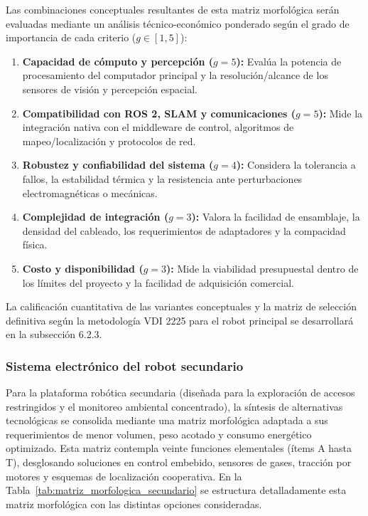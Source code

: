Las combinaciones conceptuales resultantes de esta matriz morfológica serán evaluadas mediante un análisis técnico-económico ponderado según el grado de importancia de cada criterio ($g \in [1,5]$):

\begin{enumerate}
    \item \textbf{Capacidad de cómputo y percepción ($g = 5$):} Evalúa la potencia de procesamiento del computador principal y la resolución/alcance de los sensores de visión y percepción espacial.
    \item \textbf{Compatibilidad con ROS 2, SLAM y comunicaciones ($g = 5$):} Mide la integración nativa con el middleware de control, algoritmos de mapeo/localización y protocolos de red.
    \item \textbf{Robustez y confiabilidad del sistema ($g = 4$):} Considera la tolerancia a fallos, la estabilidad térmica y la resistencia ante perturbaciones electromagnéticas o mecánicas.
    \item \textbf{Complejidad de integración ($g = 3$):} Valora la facilidad de ensamblaje, la densidad del cableado, los requerimientos de adaptadores y la compacidad física.
    \item \textbf{Costo y disponibilidad ($g = 3$):} Mide la viabilidad presupuestal dentro de los límites del proyecto y la facilidad de adquisición comercial.
\end{enumerate}

La calificación cuantitativa de las variantes conceptuales y la matriz de selección definitiva según la metodología VDI 2225 para el robot principal se desarrollará en la subsección 6.2.3.

\subsubsection{Sistema electrónico del robot secundario}

Para la plataforma robótica secundaria (diseñada para la exploración de accesos restringidos y el monitoreo ambiental concentrado), la síntesis de alternativas tecnológicas se consolida mediante una matriz morfológica adaptada a sus requerimientos de menor volumen, peso acotado y consumo energético optimizado. Esta matriz contempla veinte funciones elementales (ítems A hasta T), desglosando soluciones en control embebido, sensores de gases, tracción por motores y esquemas de localización cooperativa. En la Tabla~\ref{tab:matriz_morfologica_secundario} se estructura detalladamente esta matriz morfológica con las distintas opciones consideradas.

